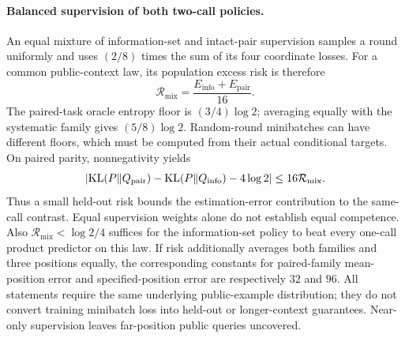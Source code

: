 \paragraph{Balanced supervision of both two-call policies.}
An equal mixture of information-set and intact-pair supervision samples a
round uniformly and uses $(2/8)$ times the sum of its four coordinate losses.
For a common public-context law, its population excess risk is therefore
\[
 \mathcal R_{\mathrm{mix}}
 =\frac{E_{\mathrm{info}}+E_{\mathrm{pair}}}{16}.
\]
The paired-task oracle entropy floor is $(3/4)\log2$; averaging equally with
the systematic family gives $(5/8)\log2$. Random-round minibatches can have
different floors, which must be computed from their actual conditional targets.
On paired parity, nonnegativity yields
\[
 \left|\operatorname{KL}(P\Vert Q_{\mathrm{pair}})
       -\operatorname{KL}(P\Vert Q_{\mathrm{info}})-4\log2\right|
 \le 16\mathcal R_{\mathrm{mix}}.
\]
Thus a small held-out risk bounds the estimation-error contribution to the
same-call contrast. Equal supervision weights alone do not establish equal
competence. Also $\mathcal R_{\mathrm{mix}}<\log2/4$ suffices for the
information-set policy to beat every one-call product predictor on this law.
If risk additionally averages both families and three positions equally,
the corresponding constants for paired-family mean-position error and
specified-position error are respectively $32$ and $96$.
All statements require the same underlying public-example distribution;
they do not convert training minibatch loss into held-out or longer-context
guarantees. Near-only supervision leaves far-position public queries uncovered.
